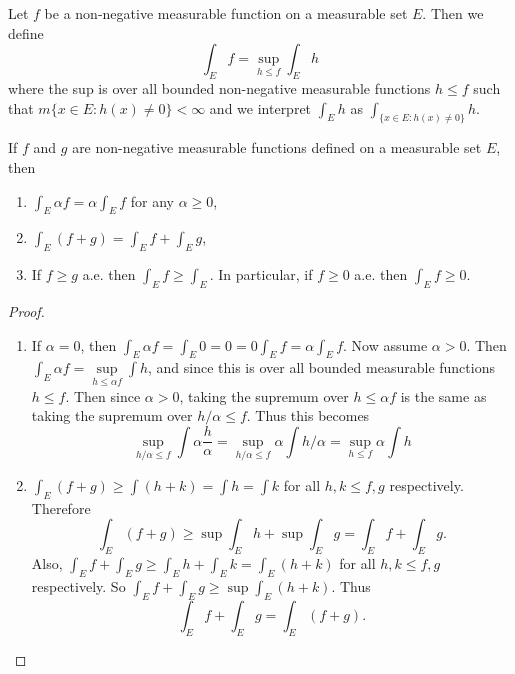 \begin{defn}\label{d:thehundred}%
	Let $f$ be a non-negative measurable function on a measurable set $E$. Then we define 
	\begin{equation*}
		\int_E f = \sup\limits_{h\le f}\int_E h
	\end{equation*}
	where the sup is over all bounded non-negative measurable functions $h \le f$ such that 
	$m\{x \in E: h(x) \neq 0\} < \infty$ and we interpret $\int_E h$ as 
	$\int_{\{x\in E:h(x)\neq0\}}h$. 
\end{defn}

\begin{pblm}\label{p:conditionsnonnegmeasu}%
	If $f$ and $g$ are non-negative measurable functions defined on a measurable set $E$, then 
	\begin{enumerate}
		\item $\int_E \alpha f = \alpha \int_E f$ for any $\alpha \ge 0$, 
		\item $\int_E(f+g) = \int_E f + \int_E g$, 
		\item If $f \ge g$ a.e. then $\int_E f \ge \int_E$. In particular, if 
		$f \ge 0$ a.e. then $\int_E f \ge 0$. 
	\end{enumerate}
\begin{proof}
~
\begin{enumerate}
	\item If $\alpha = 0$, then $\int_E \alpha f = \int_E 0 = 0 = 0\int_E f = \alpha \int_E f$. 
		Now assume $\alpha > 0$. Then 
		$\int_E \alpha f = \sup\limits_{h\le \alpha f}\int h$, and since this is over all 
		bounded measurable functions $h\le f$. Then since $\alpha > 0$, taking the supremum 
		over $h \le \alpha f$ is the same as taking the supremum over $h / \alpha \le f$. 
		Thus this becomes 
		\begin{equation*}\sup\limits_{h/\alpha \le f} \int \alpha \frac{h}{\alpha} = \sup\limits_{h/\alpha\le f} \alpha \int h/\alpha = \sup\limits_{h\le f} \alpha \int h\end{equation*}
	\item $\int_E (f + g) \ge \int(h + k) = \int h = \int k$ for all $h, k \le f, g$ respectively. 
		Therefore 
		\begin{equation*}\int_E (f + g) \ge \sup\int_E h + \sup\int_E g = \int_E f + \int_E g.\end{equation*} 
		Also, $\int_E f + \int_E g \ge \int_E h + \int_E k = \int_E(h + k)$ for all $h, k \le f, g$ respectively. 
		So $\int_E f + \int_E g \ge \sup\int_E(h+k)$. 
		Thus \begin{equation*}\int_E f + \int_E g = \int_E (f + g).\end{equation*} 

\end{enumerate}
\end{proof}
\end{pblm}
